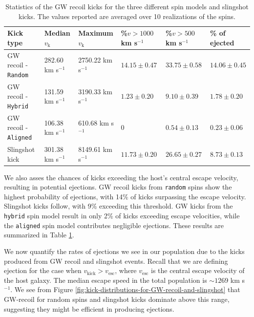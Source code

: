 \documentclass[11pt, letterpaper]{article}
\newcommand{\kms}{km s$^{-1}$}
\begin{document}
\begin{table}[!htb]
\centering
\resizebox{\textwidth}{!}
{\begin{tabular}{|l|l|l|l|l|l|}
\hline
\textbf{Kick type} & \textbf{Median $v_{\text{k}}$} & \textbf{Maximum $v_{\text{k}}$} & \textbf{\%$ v > 1000$ \kms} & \textbf{\%$v > 500$ \kms} & \textbf{\% of ejected} \\ \hline
GW recoil - \texttt{Random}            & 282.60 \kms                                 & 2750.22 \kms                 & $14.15 \pm 0.47$                    & $33.75 \pm 0.58$                     & $14.06 \pm 0.45$                     \\ \hline
GW recoil - \texttt{Hybrid}             & 131.59 \kms                                 & 3190.33 \kms                  & $1.23 \pm 0.20$                     & $9.10 \pm 0.39$                      & $1.78 \pm 0.20$                 \\ \hline
GW recoil - \texttt{Aligned}            & 106.38 \kms                                 & 610.68 \kms                  & 0                     & $0.54 \pm 0.13$                      & $0.23 \pm 0.06$                      \\ \hline
Slingshot kick         & 301.38 \kms                                  & 8149.61 \kms                  & $11.73 \pm 0.20$                    &   $26.65 \pm 0.27$                    & $8.73 \pm 0.13$                      \\ \hline
\end{tabular}
}
\caption{Statistics of the GW recoil kicks for the three different spin models and slingshot kicks. The values reported are averaged over 10 realizations of the spins.} 
\label{table:recoil-statistics} 
\end{table}


We also asses the chances of kicks exceeding the host's central escape velocity, resulting in potential ejections. GW recoil kicks from \texttt{random} spins show the highest probability of ejections, with 14\% of kicks surpassing the escape velocity. Slingshot kicks follow, with 9\% exceeding this threshold. GW kicks from the \texttt{hybrid} spin model result in only 2\% of kicks exceeding escape velocities, while the \texttt{aligned} spin model contributes negligible ejections. These results are summarized in Table \ref{table:recoil-statistics}.

We now quantify the rates of ejections we see in our population due to the kicks produced from GW recoil and slingshot events. Recall that we are defining ejection for the case when $v_{\text{kick}} > v_{\text{esc}}$, where $v_{\text{esc}}$ is the central escape velocity of the host galaxy. The median escape speed in the total population is $\sim 1269$ \kms. We see from Figure \ref{fig:kick-distributions-for-GW-recoil-and-slingshot} that GW-recoil for random spins and slingshot kicks dominate above this range, suggesting they might be efficient in producing ejections. 
\end{document}
